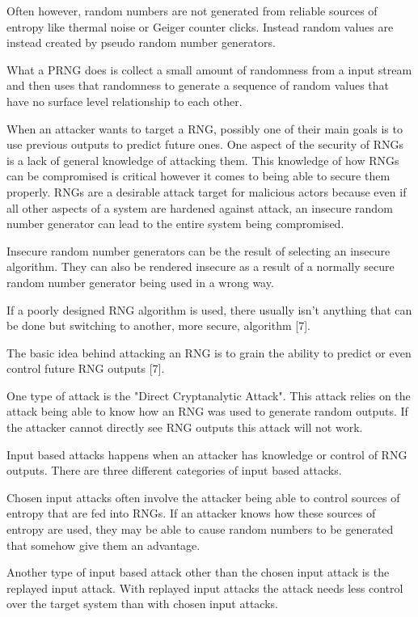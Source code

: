 \documentclass{article}
\begin{document}
    Often however, random numbers are not generated from reliable sources
    of entropy like thermal noise or Geiger counter clicks.
    Instead random values are instead created by pseudo random number generators.

    What a PRNG does is collect a small amount of randomness from a input stream
    and then uses that randomness to generate a sequence of random values that
    have no surface level relationship to each other.

    When an attacker wants to target a RNG, possibly one of their main goals
    is to use previous outputs to predict future ones.
    One aspect of the security of RNGs is a lack of general knowledge of
    attacking them. This knowledge of how RNGs can be compromised is critical however
    it comes to being able to secure them properly.
    RNGs are a desirable attack target for malicious actors because even if all
    other aspects of a system are hardened against attack, an insecure random
    number generator can lead to the entire system being compromised.

    Insecure random number generators can be the result of selecting an insecure algorithm.
    They can also be rendered insecure as a result of a normally secure random number
    generator being used in a wrong way.

    If a poorly designed RNG algorithm is used, there usually isn't anything that
    can be done but switching to another, more secure, algorithm [7].

    The basic idea behind attacking an RNG is to grain the ability to predict
    or even control future RNG outputs [7].

    One type of attack is the "Direct Cryptanalytic Attack". This attack
    relies on the attack being able to know how an RNG was used to generate
    random outputs.
    If the attacker cannot directly see RNG outputs this attack will not work.

    Input based attacks happens when an attacker has knowledge or control of RNG outputs.
    There are three different categories of input based attacks.
    
    Chosen input attacks often involve the attacker being able to control sources
    of entropy that are fed into RNGs. If an attacker knows how these
    sources of entropy are used, they may be able to cause random numbers
    to be generated that somehow give them an advantage.

    Another type of input based attack other than the chosen input attack is
    the replayed input attack. With replayed input attacks the attack
    needs less control over the target system than with chosen input attacks.
\end{document}
